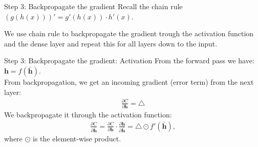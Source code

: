 \documentclass{beamer}
\begin{document}
		
		\begin{frame}{Step 3: Backpropagate the gradient}
		Recall the chain rule $(g(h(x)))' = g'(h(x)) \cdot h'(x)$. %

		We use chain rule to backpropagate the gradient trough the activation function and the dense layer and repeat this for all layers down to the input.
	\end{frame}
	
	\begin{frame}{Step 3: Backpropagate the gradient: Activation}
		From the forward pass we have: $\mathbf{h} = f(\bar{\mathbf{h}})$. \\
		From backpropagation, we get an incoming gradient (error term) from the next layer:  
		\begin{align*}
        \frac{\partial C}{\partial \mathbf{h}} = \triangle
      \end{align*}
			We backpropagate it through the activation function:
			\begin{align*}
        \frac{\partial C}{\partial \bar{\mathbf{h}}} = \frac{\partial C}{\partial \mathbf{h}} \cdot \frac{\partial \mathbf{h}}{\partial \bar{\mathbf{h}}} = \triangle \odot f'(\bar{\mathbf{h}}),
      \end{align*}
			where $\odot$ is the element-wise product.
	\end{frame}
	
\end{document}
